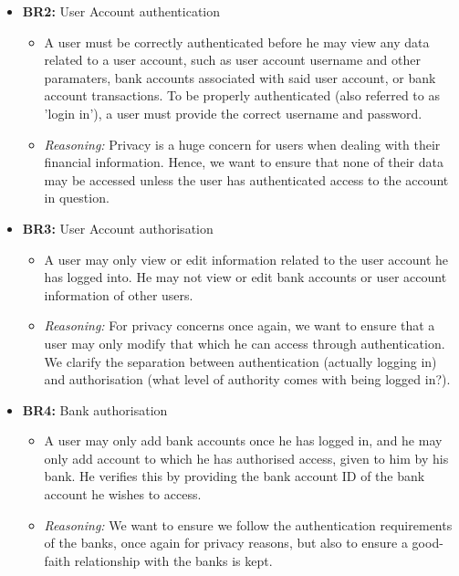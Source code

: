 \documentclass[11pt]{article}
\newcounter{use case ID}
\newcounter{req ID}
\begin{document}
\begin{itemize}
    \item \textbf{BR2: } User Account authentication
    \begin{itemize}
        \item A user must be correctly authenticated before he may view any data related to a user account, such as user account username and other paramaters, bank accounts associated with said user account, or bank account transactions. To be properly authenticated (also referred to as 'login in'), a user must provide the correct username and password.
        \item \textit{Reasoning:} Privacy is a huge concern for users when dealing with their financial information. Hence, we want to ensure that none of their data may be accessed unless the user has authenticated access to the account in question.
    \end{itemize}
\end{itemize}


\begin{itemize}
    \item \textbf{BR3: }User Account authorisation
    \begin{itemize}
        \item A user may only view or edit information related to the user account he has logged into. He may not view or edit bank accounts or user account information of other users.
        \item \textit{Reasoning:} For privacy concerns once again, we want to ensure that a user may only modify that which he can access through authentication. We clarify the separation between authentication (actually logging in) and authorisation (what level of authority comes with being logged in?).
    \end{itemize}
\end{itemize}


\begin{itemize}
    \item \textbf{BR4: } Bank authorisation
    \begin{itemize}
        \item  A user may only add bank accounts once he has logged in, and he may only add account to which he has authorised access, given to him by his bank. He verifies this by providing the bank account ID of the bank account he wishes to access.
        \item \textit{Reasoning:} We want to ensure we follow the authentication requirements of the banks, once again for privacy reasons, but also to ensure a good-faith relationship with the banks is kept.
    \end{itemize}
\end{itemize}
\end{document}
